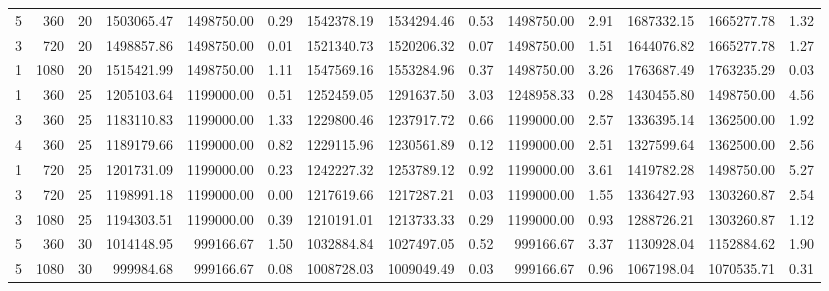 \begin{tabular}{rrrrrrrrrrrrrr}
     5 &   360 &    20 &    1503065.47 & 1498750.00 &            0.29 &     1542378.19 &  1534294.46 &                 0.53 &     1498750.00 &                    2.91 &    1687332.15 & 1665277.78 &            1.32 \\
     3 &   720 &    20 &    1498857.86 & 1498750.00 &            0.01 &     1521340.73 &  1520206.32 &                 0.07 &     1498750.00 &                    1.51 &    1644076.82 & 1665277.78 &            1.27 \\
     1 &  1080 &    20 &    1515421.99 & 1498750.00 &            1.11 &     1547569.16 &  1553284.96 &                 0.37 &     1498750.00 &                    3.26 &    1763687.49 & 1763235.29 &            0.03 \\
     1 &   360 &    25 &    1205103.64 & 1199000.00 &            0.51 &     1252459.05 &  1291637.50 &                 3.03 &     1248958.33 &                    0.28 &    1430455.80 & 1498750.00 &            4.56 \\
     3 &   360 &    25 &    1183110.83 & 1199000.00 &            1.33 &     1229800.46 &  1237917.72 &                 0.66 &     1199000.00 &                    2.57 &    1336395.14 & 1362500.00 &            1.92 \\
     4 &   360 &    25 &    1189179.66 & 1199000.00 &            0.82 &     1229115.96 &  1230561.89 &                 0.12 &     1199000.00 &                    2.51 &    1327599.64 & 1362500.00 &            2.56 \\
     1 &   720 &    25 &    1201731.09 & 1199000.00 &            0.23 &     1242227.32 &  1253789.12 &                 0.92 &     1199000.00 &                    3.61 &    1419782.28 & 1498750.00 &            5.27 \\
     3 &   720 &    25 &    1198991.18 & 1199000.00 &            0.00 &     1217619.66 &  1217287.21 &                 0.03 &     1199000.00 &                    1.55 &    1336427.93 & 1303260.87 &            2.54 \\
     3 &  1080 &    25 &    1194303.51 & 1199000.00 &            0.39 &     1210191.01 &  1213733.33 &                 0.29 &     1199000.00 &                    0.93 &    1288726.21 & 1303260.87 &            1.12 \\
     5 &   360 &    30 &    1014148.95 &  999166.67 &            1.50 &     1032884.84 &  1027497.05 &                 0.52 &      999166.67 &                    3.37 &    1130928.04 & 1152884.62 &            1.90 \\
     5 &  1080 &    30 &     999984.68 &  999166.67 &            0.08 &     1008728.03 &  1009049.49 &                 0.03 &      999166.67 &                    0.96 &    1067198.04 & 1070535.71 &            0.31 \\
\bottomrule
\end{tabular}
